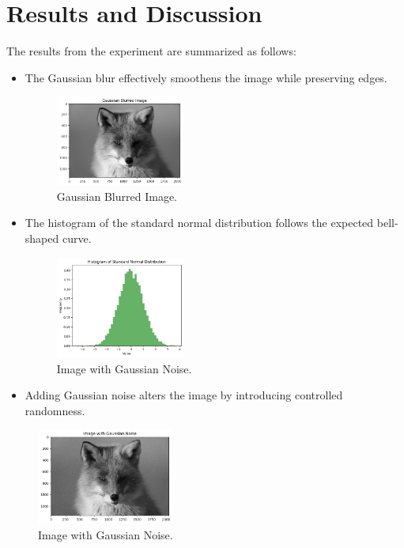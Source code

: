 \documentclass{report}
\begin{document}
\section{Results and Discussion}
The results from the experiment are summarized as follows:
\begin{itemize}
    \item The Gaussian blur effectively smoothens the image while preserving edges.
    \begin{figure}[h!]
    \centering
    \includegraphics[width=0.4\textwidth]{images/Exp-5-Results-1.png} %
    \caption{Gaussian Blurred Image.}
    \label{fig:blurred}
\end{figure}
    \item The histogram of the standard normal distribution follows the expected bell-shaped curve.
    \begin{figure}[h!]
    \centering
    \includegraphics[width=0.4\textwidth]{images/Exp-5-Results-2.png} %
    \caption{Image with Gaussian Noise.}
    \label{fig:noisy}
\end{figure}
    \item Adding Gaussian noise alters the image by introducing controlled randomness.
\end{itemize}
\begin{figure}[h!]
    \centering
    \includegraphics[width=0.4\textwidth]{images/Exp-5-Results-3.png} %
    \caption{Image with Gaussian Noise.}
    \label{fig:noisy}
\end{figure}
\end{document}
